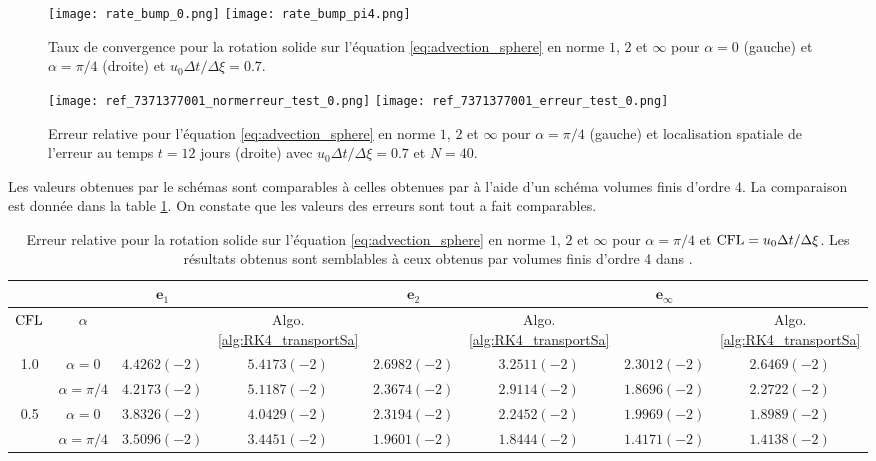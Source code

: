 \begin{figure}[htbp]
\begin{center}
\texttt{[image: rate\_bump\_0.png]}
\texttt{[image: rate\_bump\_pi4.png]}
\end{center}
\caption{Taux de convergence pour la rotation solide sur l'équation \eqref{eq:advection_sphere} en norme $1$, $2$ et $\infty$ pour $\alpha = 0$ (gauche) et $\alpha = \pi / 4$ (droite) et $u_0 \Delta t / \Delta \xi = 0.7$.}
\label{fig:rate_bump}
\end{figure}

\begin{figure}[htbp]
\begin{center}
\texttt{[image: ref\_7371377001\_normerreur\_test\_0.png]}
\texttt{[image: ref\_7371377001\_erreur\_test\_0.png]}
\end{center}
\caption{Erreur relative pour l'équation \eqref{eq:advection_sphere} en norme $1$, $2$ et $\infty$ pour $\alpha = \pi/4$ (gauche) et localisation spatiale de l'erreur au temps $t=12$ jours (droite) avec $u_0 \Delta t / \Delta \xi = 0.7$ et $N=40$.}
\label{fig:erreur_bump}
\end{figure}

Les valeurs obtenues par le schémas sont comparables à celles obtenues par \cite{Ullrich2010, Ullrich2011} à l'aide d'un schéma volumes finis d'ordre 4. La comparaison est donnée dans la table \ref{tab:comp_ullrich_bump}. On constate que les valeurs des erreurs sont tout a fait comparables.

\begin{table}[htbp]
\begin{center}
\begin{tabular}{|cc||cc||cc||cc|}
\hline 
 & & $\mathbf{e}_1$ &   & $\mathbf{e}_2$ &   & $\mathbf{e}_{\infty}$ &   \\ 
\hline 
$\text{CFL}$ & $\alpha$ & \cite{Ullrich2010} & Algo. \ref{alg:RK4_transportSa} & \cite{Ullrich2010} & Algo. \ref{alg:RK4_transportSa} & \cite{Ullrich2010} & Algo. \ref{alg:RK4_transportSa} \\ 
\hline 
1.0 & $\alpha = 0$ & $4.4262(-2)$ & $5.4173(-2)$ & $2.6982(-2)$ & $3.2511(-2)$ & $2.3012(-2)$ & $2.6469(-2)$ \\ 

  & $\alpha = \pi / 4$ & $4.2173(-2)$ & $5.1187(-2)$ & $2.3674(-2)$ & $2.9114(-2)$ & $1.8696(-2)$ & $2.2722(-2)$ \\ 
\hline 
0.5 & $\alpha = 0$ & $3.8326(-2)$ & $4.0429(-2)$ & $2.3194(-2)$ & $2.2452(-2)$ & $1.9969(-2)$ & $1.8989(-2)$ \\ 

  & $\alpha = \pi/4$ & $3.5096(-2)$ & $3.4451(-2)$ & $1.9601(-2)$ & $1.8444(-2)$ & $1.4171(-2)$ & $1.4138(-2)$ \\ 
\hline 
\end{tabular} 
\end{center}
\caption{Erreur relative pour la rotation solide sur l'équation \eqref{eq:advection_sphere} en norme $1$, $2$ et $\infty$ pour $\alpha = \pi / 4$ et $\text{CFL} = u_0 \Delta t / \Delta \xi$. Les résultats obtenus sont semblables à ceux obtenus par volumes finis d'ordre 4 dans \cite{Ullrich2010}.}
\label{tab:comp_ullrich_bump}
\end{table} 

